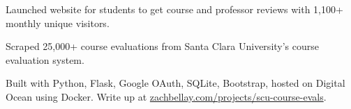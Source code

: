 \documentclass[]{deedy-resume-openfont}
\begin{document}



\hfill{}

\begin{tightemize}
\item Launched website for students to get course and professor reviews with 1,100+ monthly unique visitors.
\item Scraped 25,000+ course evaluations from Santa Clara University's course evaluation system.
\item Built with Python, Flask, Google OAuth, SQLite, Bootstrap, hosted on Digital Ocean using Docker. Write up at \href{https://zachbellay.com/projects/scu-course-evals}{zachbellay.com/projects/scu-course-evals}.
\end{tightemize}



\end{document}
